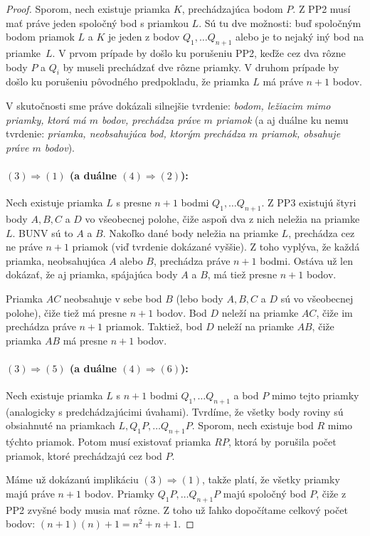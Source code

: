 \begin{proof}
Sporom, nech existuje priamka $K$, prechádzajúca bodom $P$. 
Z PP2 musí mať práve jeden spoločný bod s priamkou $L$. 
Sú tu dve možnosti: buď spoločným bodom priamok $L$ a $K$ je jeden z bodov $Q_1, \ldots Q_{n+1}$ alebo je to nejaký iný bod na priamke~$L$. 
V prvom prípade by došlo ku porušeniu PP2, keďže cez dva rôzne body $P$ a $Q_i$ by museli prechádzať dve rôzne priamky. 
V druhom prípade by došlo ku porušeniu pôvodného predpokladu, že priamka $L$ má práve $n+1$ bodov.

V skutočnosti sme práve dokázali silnejšie tvrdenie: \emph{bodom, ležiacim mimo priamky, ktorá má $m$ bodov, prechádza práve $m$ priamok} (a aj duálne ku nemu tvrdenie: \emph{priamka, neobsahujúca bod, ktorým prechádza $m$ priamok, obsahuje práve $m$ bodov}).

\paragraph{$(3) \Longrightarrow (1)$ (a duálne $(4) \Longrightarrow (2)$):} 
Nech existuje priamka $L$ s presne $n+1$ bodmi $Q_1, \ldots Q_{n+1}$. 
Z PP3 existujú štyri body $A, B, C$ a $D$ vo všeobecnej polohe, čiže aspoň dva z nich neležia na priamke $L$.
BUNV sú to $A$ a $B$.
Nakoľko dané body neležia na priamke $L$, prechádza cez ne práve $n+1$ priamok (viď tvrdenie dokázané vyššie).
Z toho vyplýva, že každá priamka, neobsahujúca $A$ alebo $B$, prechádza práve $n+1$ bodmi.
Ostáva už len dokázať, že aj priamka, spájajúca body $A$ a $B$, má tiež presne $n+1$ bodov.

Priamka $AC$ neobsahuje v sebe bod $B$ (lebo body $A,B,C$ a $D$ sú vo všeobecnej polohe), čiže tiež má presne $n+1$ bodov. 
Bod $D$ neleží na priamke $AC$, čiže im prechádza práve $n+1$ priamok.
Taktiež, bod $D$ neleží na priamke $AB$, čiže priamka $AB$ má presne $n+1$ bodov.

\paragraph{$(3) \Longrightarrow (5)$ (a duálne $(4) \Longrightarrow (6)$):}
Nech existuje priamka $L$ s $n+1$ bodmi $Q_1, \ldots Q_{n+1}$ a bod $P$ mimo tejto priamky (analogicky s predchádzajúcimi úvahami). 
Tvrdíme, že všetky body roviny sú obsiahnuté na priamkach $L, Q_1 P, \ldots Q_{n+1} P $.
Sporom, nech existuje bod $R$ mimo týchto priamok.
Potom musí existovať priamka $RP$, ktorá by porušila počet priamok, ktoré prechádzajú cez bod $P$.

Máme už dokázanú implikáciu $(3) \Longrightarrow (1)$, takže platí, že všetky priamky majú práve $n+1$ bodov.
Priamky $ Q_1 P, \ldots Q_{n+1} P $ majú spoločný bod $P$, čiže z PP2 zvyšné body musia mať rôzne.
Z toho už ľahko dopočítame celkový počet bodov: $(n+1) (n) + 1 = n^2 + n + 1$.


\end{proof}

